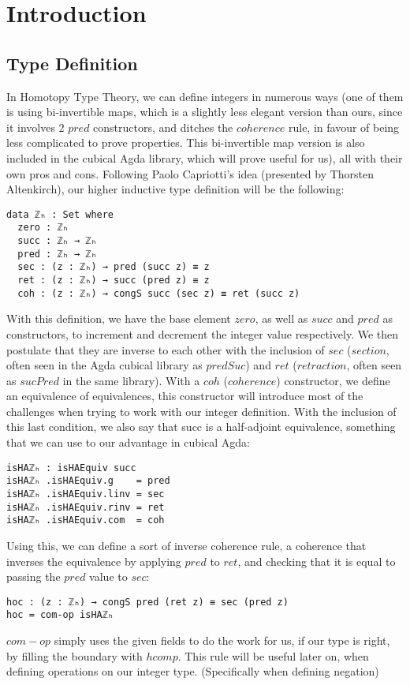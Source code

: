 \chapter{Introduction}
\label{ch:intro}

\section{Type Definition}

In Homotopy Type Theory, we can define integers in numerous ways (one of them is using bi-invertible maps, which is a slightly less elegant version than ours\cite{10.1145/3373718.3394760}, since it involves 2 $pred$ constructors, and ditches the $coherence$ rule, in favour of being less complicated to prove properties. This bi-invertible map version is also included in the cubical Agda library\cite{biinv-agda}, which will prove useful for us), all with their own pros and cons. Following Paolo Capriotti's idea (presented by Thorsten Altenkirch\cite{bonn_2018}), our higher inductive type definition will be the following:
\begin{verbatim}
data ℤₕ : Set where
  zero : ℤₕ
  succ : ℤₕ → ℤₕ
  pred : ℤₕ → ℤₕ
  sec : (z : ℤₕ) → pred (succ z) ≡ z
  ret : (z : ℤₕ) → succ (pred z) ≡ z
  coh : (z : ℤₕ) → congS succ (sec z) ≡ ret (succ z)
\end{verbatim}
With this definition, we have the base element $zero$, as well as $succ$ and $pred$ as constructors, to increment and decrement the integer value respectively. We then postulate that they are inverse to each other with the inclusion of $sec$ ($section$, often seen in the Agda cubical library as $predSuc$) and $ret$ ($retraction$, often seen as $sucPred$ in the same library). With a $coh$ ($coherence$) constructor, we define an equivalence of equivalences, this constructor will introduce most of the challenges when trying to work with our integer definition. With the inclusion of this last condition, we also say that succ is a half-adjoint equivalence, something that we can use to our advantage in cubical Agda:
\begin{verbatim}
isHAℤₕ : isHAEquiv succ
isHAℤₕ .isHAEquiv.g    = pred
isHAℤₕ .isHAEquiv.linv = sec
isHAℤₕ .isHAEquiv.rinv = ret
isHAℤₕ .isHAEquiv.com  = coh
\end{verbatim}
Using this, we can define a sort of inverse coherence rule, a coherence that inverses the equivalence by applying $pred$ to $ret$, and checking that it is equal to passing the $pred$ value to $sec$:
\begin{verbatim}
hoc : (z : ℤₕ) → congS pred (ret z) ≡ sec (pred z)
hoc = com-op isHAℤₕ
\end{verbatim}
$com-op$ simply uses the given fields to do the work for us, if our type is right, by filling the boundary with $hcomp$.
This rule will be useful later on, when defining operations on our integer type. (Specifically when defining negation)


